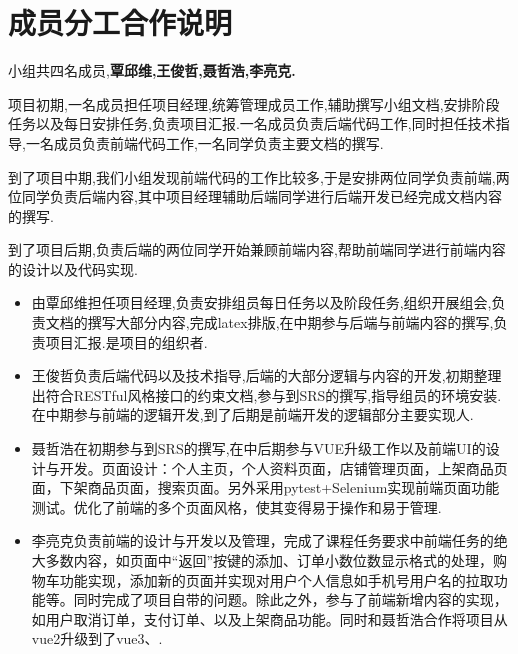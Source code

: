 \chapter{成员分工合作说明}

小组共四名成员,\textbf{覃邱维,王俊哲,聂哲浩,李亮克.}

项目初期,一名成员担任项目经理,统筹管理成员工作,辅助撰写小组文档,安排阶段任务以及每日安排任务,负责项目汇报.一名成员负责后端代码工作,同时担任技术指导,一名成员负责前端代码工作,一名同学负责主要文档的撰写.

到了项目中期,我们小组发现前端代码的工作比较多,于是安排两位同学负责前端,两位同学负责后端内容,其中项目经理辅助后端同学进行后端开发已经完成文档内容的撰写.

到了项目后期,负责后端的两位同学开始兼顾前端内容,帮助前端同学进行前端内容的设计以及代码实现.

\begin{itemize}
    \item 由覃邱维担任项目经理,负责安排组员每日任务以及阶段任务,组织开展组会,负责文档的撰写大部分内容,完成latex排版,在中期参与后端与前端内容的撰写,负责项目汇报.是项目的组织者.
    \item 王俊哲负责后端代码以及技术指导,后端的大部分逻辑与内容的开发,初期整理出符合RESTful风格接口的约束文档,参与到SRS的撰写,指导组员的环境安装.在中期参与前端的逻辑开发,到了后期是前端开发的逻辑部分主要实现人.
    \item 聂哲浩在初期参与到SRS的撰写,在中后期参与VUE升级工作以及前端UI的设计与开发。页面设计：个人主页，个人资料页面，店铺管理页面，上架商品页面，下架商品页面，搜索页面。另外采用pytest+Selenium实现前端页面功能测试。优化了前端的多个页面风格，使其变得易于操作和易于管理.
    \item 李亮克负责前端的设计与开发以及管理，完成了课程任务要求中前端任务的绝大多数内容，如页面中“返回”按键的添加、订单小数位数显示格式的处理，购物车功能实现，添加新的页面并实现对用户个人信息如手机号用户名的拉取功能等。同时完成了项目自带的问题。除此之外，参与了前端新增内容的实现，如用户取消订单，支付订单、以及上架商品功能。同时和聂哲浩合作将项目从vue2升级到了vue3、.
\end{itemize}